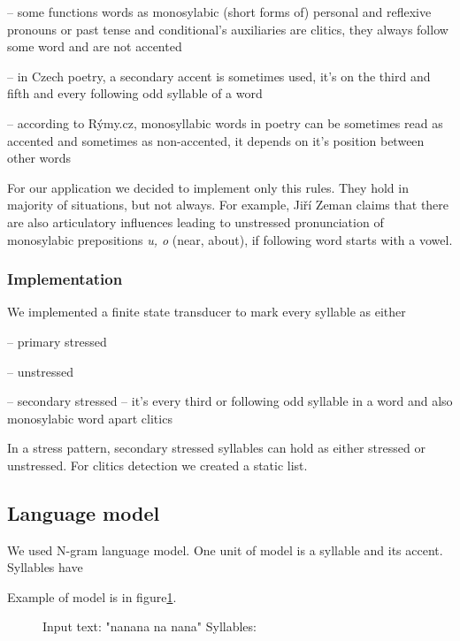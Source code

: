\documentclass[a4]{article}
\begin{document}

-- some functions words as monosylabic (short forms of) personal and
reflexive pronouns or past tense and conditional's auxiliaries are clitics,
they always follow some word and are not accented %

-- in Czech poetry, a secondary accent is sometimes used, it's on the third and
fifth and every following odd syllable of a word

-- according to Rýmy.cz\cite{rymy}, monosyllabic words in poetry can be
sometimes read as accented and sometimes as non-accented, it depends on
it's position between other words

For our application we decided to implement only this rules. They hold in
majority of situations, but not always. For example, Jiří Zeman\cite{zeman} claims that
there are also articulatory influences leading to unstressed
pronunciation of monosylabic prepositions {\sl u, o} (near, about), if
following word starts with a vowel. %

\subsubsection{Implementation}

We implemented a finite state transducer\cite{jurafsky} to mark every syllable as either 

-- primary stressed

-- unstressed

-- secondary stressed -- it's every third or following odd syllable in
a word and also monosylabic word apart clitics

In a stress pattern, secondary stressed syllables can hold as either
stressed or unstressed.  
For clitics detection we created a static list.


\subsection{Language model}

We used N-gram language model. One unit of model is
a syllable and its accent. Syllables have 

Example of model is in figure\ref{fig:model}.

\begin{figure}[ht]
\centerline{
Input text:
"nanana na nana"
Syllables:
}
\caption{
}
\label{fig:model}
\end{figure}
\end{document}
